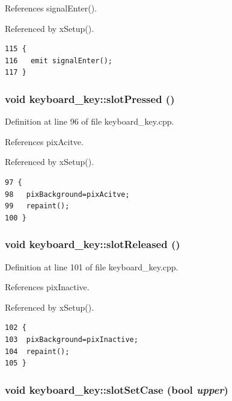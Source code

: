 References signal\-Enter().

Referenced by x\-Setup().



\footnotesize\begin{verbatim}115 {
116   emit signalEnter();
117 }
\end{verbatim}\normalsize 
{}
\subsubsection{\setlength{\rightskip}{0pt plus 5cm}void keyboard\_\-key::slot\-Pressed ()\hspace{0.3cm}{\tt  [slot]}}\label{classkeyboard__key_keyboard__keyi2}




Definition at line 96 of file keyboard\_\-key.cpp.

References pix\-Acitve.

Referenced by x\-Setup().



\footnotesize\begin{verbatim}97 {
98   pixBackground=pixAcitve;
99   repaint();
100 }
\end{verbatim}\normalsize 
{}
\subsubsection{\setlength{\rightskip}{0pt plus 5cm}void keyboard\_\-key::slot\-Released ()\hspace{0.3cm}{\tt  [slot]}}\label{classkeyboard__key_keyboard__keyi3}




Definition at line 101 of file keyboard\_\-key.cpp.

References pix\-Inactive.

Referenced by x\-Setup().



\footnotesize\begin{verbatim}102 {
103  pixBackground=pixInactive;
104  repaint();
105 }
\end{verbatim}\normalsize 
{}
\subsubsection{\setlength{\rightskip}{0pt plus 5cm}void keyboard\_\-key::slot\-Set\-Case (bool {\em upper})\hspace{0.3cm}{\tt  [slot]}}\label{classkeyboard__key_keyboard__keyi0}




